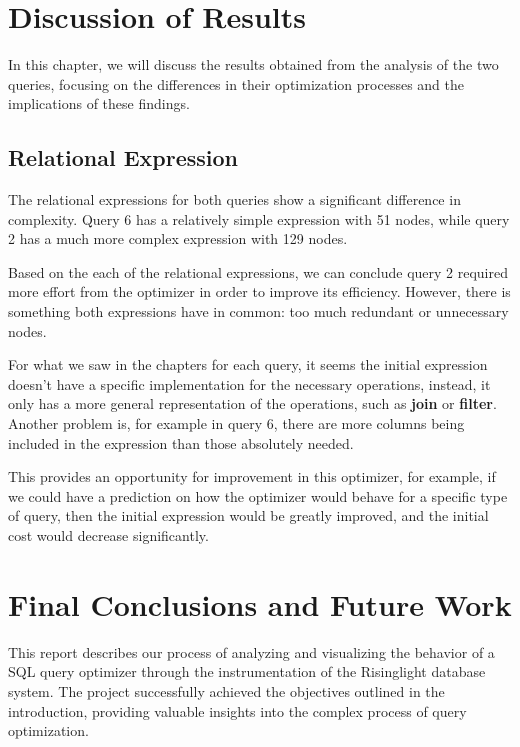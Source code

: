 \documentclass[a4paper,12pt]{scrreprt}
\begin{document}
\chapter{Discussion of Results} \label{chap:discussion}
\thispagestyle{fancy}

In this chapter, we will discuss the results obtained from the analysis of the two queries, focusing on the differences in their optimization processes and the implications of these findings.

\section{Relational Expression}
The relational expressions for both queries show a significant difference in complexity. Query 6 has a relatively simple expression with 51 nodes, while query 2 has a much more complex expression with 129 nodes.

Based on the each of the relational expressions, we can conclude query 2 required more effort from the optimizer in order to improve its efficiency. However, there is something both expressions have in common: too much redundant or unnecessary nodes.

For what we saw in the chapters for each query, it seems the initial expression doesn't have a specific implementation for the necessary operations, instead, it only has a more general representation of the operations, such as \textbf{join} or \textbf{filter}. Another problem is, for example in query 6, there are more columns being included in the expression than those absolutely needed.

This provides an opportunity for improvement in this optimizer, for example, if we could have a prediction on how the optimizer would behave for a specific type of query, then the initial expression would be greatly improved, and the initial cost would decrease significantly.



\chapter{Final Conclusions and Future Work} \label{chap:concl}
\thispagestyle{fancy}
This report describes our process of analyzing and visualizing the behavior of a SQL query optimizer through the instrumentation of the Risinglight database system. The project successfully achieved the objectives outlined in the introduction, providing valuable insights into the complex process of query optimization.
\end{document}
